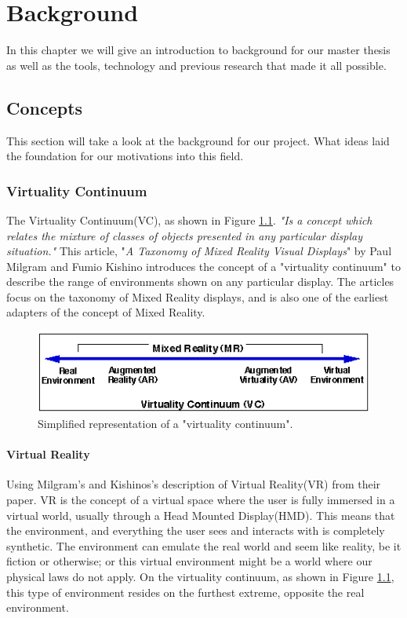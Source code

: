 \chapter{Background}
\label{chap:background}
In this chapter we will give an introduction to background for our master thesis as well as the tools, technology and previous research that made it all possible. 

\section{Concepts}
    This section will take a look at the background for our project. What ideas laid the foundation for our motivations into this field.
    
    \subsection{Virtuality Continuum}
    The Virtuality Continuum(VC), as shown in Figure \ref{fig:virtualcontinuum}. \emph{"Is a concept which relates the mixture of classes of objects presented in any particular display situation."}\cite{Milgram1994} This article, "\emph{A Taxonomy of Mixed Reality Visual Displays}" by Paul Milgram and Fumio Kishino\cite{Milgram1994} introduces the concept of a "virtuality continuum" to describe the range of environments shown on any particular display. The articles focus on the taxonomy of Mixed Reality displays, and is also one of the earliest adapters of the concept of Mixed Reality.
    \begin{figure}[!ht]
        \centering
        \includegraphics[scale=1]{figures/virtualcontinuum.png}
        \caption{Simplified representation of a "virtuality continuum".\cite{Milgram1994}}
        \label{fig:virtualcontinuum}
    \end{figure}
    
    \subsubsection{Virtual Reality}
    Using Milgram's and Kishinos's description of Virtual Reality(VR) from their paper.\cite{Milgram1994} VR is the concept of a virtual space where the user is fully immersed in a virtual world, usually through a Head Mounted Display(HMD). This means that the environment, and everything the user sees and interacts with is completely synthetic. The environment can emulate the real world and seem like reality, be it fiction or otherwise; or this virtual environment might be a world where our physical laws do not apply. On the virtuality continuum, as shown in Figure \ref{fig:virtualcontinuum}, this type of environment resides on the furthest extreme, opposite the real environment.

